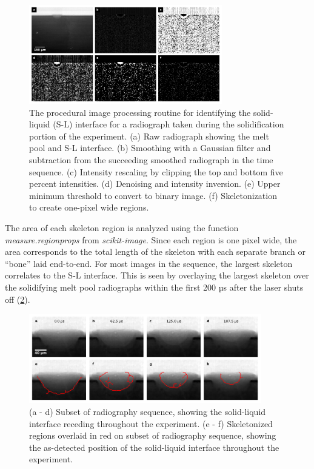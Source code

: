 \begin{figure}[ht!]
    \centering
    \includegraphics[width=0.75\textwidth]
    {figures/04/02-routine.png}
    \caption{
        \small{}
        The procedural image processing routine for identifying the
        solid-liquid (S-L) interface for a radiograph taken during the
        solidification portion of the experiment.
        (a) Raw radiograph showing the melt pool and S-L interface.
        (b) Smoothing with a Gaussian filter and subtraction from the
        succeeding smoothed radiograph in the time sequence.
        (c) Intensity rescaling by clipping the top and bottom five percent
        intensities.
        (d) Denoising and intensity inversion.
        (e) Upper minimum threshold to convert to binary image.
        (f) Skeletonization to create one-pixel wide regions.
    }
    \label{fig/routine}
\end{figure}

The area of each skeleton region is analyzed using the function
\textit{measure.regionprops} from \textit{scikit-image}.
Since each region is one pixel
wide, the area corresponds to the total length of the skeleton with each
separate branch or ``bone'' laid end-to-end. For most images in the
sequence, the largest skeleton correlates to the S-L interface. This is
seen by overlaying the largest skeleton over the solidifying melt pool
radiographs within the first 200 µs after the laser shuts off
(\ref{fig/skel-overlay}).

\begin{figure}[ht]
    \centering
    \includegraphics[width=0.9\textwidth]{figures/04/03-skel-overlay.png}
    \caption{
        \small{}
        (a - d) Subset of radiography sequence, showing the solid-liquid
        interface receding throughout the experiment.
        (e - f) Skeletonized regions overlaid in red on subset of
        radiography sequence, showing the as-detected position of the
        solid-liquid interface throughout the experiment.
    }
    \label{fig/skel-overlay}
\end{figure}

